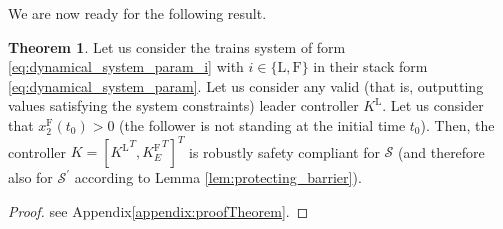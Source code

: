 \documentclass[letterpaper, 10 pt, conference]{ieeeconf}
\theoremstyle{definition}
\theoremstyle{nopoint}
\newtheorem{theorem}{Theorem}[section]
\newcounter{Theorem}
\begin{document}
We are now ready for the following result. 
\begin{theorem}\label{thm:trains_barrier}
Let us consider the trains system of form \eqref{eq:dynamical_system_param_i} with $i\in\{\mathrm{L},\mathrm{F}\}$ in their stack form \eqref{eq:dynamical_system_param}. 
Let us consider any valid (that is, outputting values satisfying the system constraints) leader controller $K^\mathrm{L}$. Let us consider that $x_2^\mathrm{F}(t_0)>0$ (the follower is not standing at the initial time $t_0$).
Then, the controller $K=[{K^\mathrm{L}}^T, {K^\mathrm{F}_E}^T]^T$ is robustly safety compliant for $\mathcal{S}$ (and therefore also for $\mathcal{S}^\prime$ according to Lemma \ref{lem:protecting_barrier}).

\begin{proof}
	see Appendix\ref{appendix:proofTheorem}.
\end{proof}
%
%
%
%
%
%
%

\end{theorem}
\end{document}

